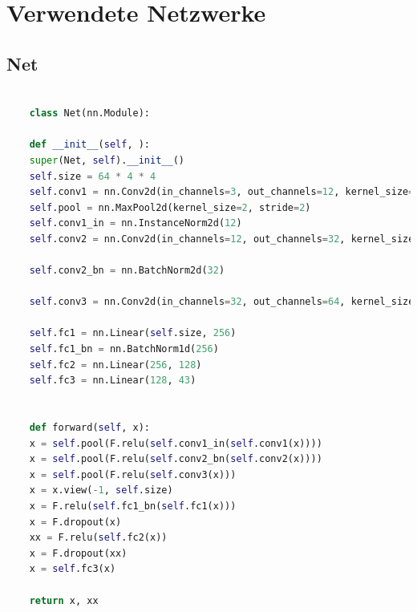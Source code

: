 \documentclass[twoside, 11pt,a4paper]{article}
\numberwithin{equation}{section}
\begin{document}
	\printglossaries
	\newpage
	\appendix
	\section{Verwendete Netzwerke}
	\subsection{Net}
	
	\begin{lstlisting}[language=Python, caption=Kleines Netzwerk]
	
	class Net(nn.Module):
	
	def __init__(self, ):
	super(Net, self).__init__()
	self.size = 64 * 4 * 4
	self.conv1 = nn.Conv2d(in_channels=3, out_channels=12, kernel_size=5, padding=2)
	self.pool = nn.MaxPool2d(kernel_size=2, stride=2)
	self.conv1_in = nn.InstanceNorm2d(12)
	self.conv2 = nn.Conv2d(in_channels=12, out_channels=32, kernel_size=5, padding=2)
	
	self.conv2_bn = nn.BatchNorm2d(32)
	
	self.conv3 = nn.Conv2d(in_channels=32, out_channels=64, kernel_size=5, padding=2)
	
	self.fc1 = nn.Linear(self.size, 256)
	self.fc1_bn = nn.BatchNorm1d(256)
	self.fc2 = nn.Linear(256, 128)
	self.fc3 = nn.Linear(128, 43)
	
	
	def forward(self, x):
	x = self.pool(F.relu(self.conv1_in(self.conv1(x))))
	x = self.pool(F.relu(self.conv2_bn(self.conv2(x))))
	x = self.pool(F.relu(self.conv3(x)))
	x = x.view(-1, self.size)
	x = F.relu(self.fc1_bn(self.fc1(x)))
	x = F.dropout(x)
	xx = F.relu(self.fc2(x))
	x = F.dropout(xx)
	x = self.fc3(x)
	
	return x, xx
	
	\end{lstlisting}
	
\end{document}
